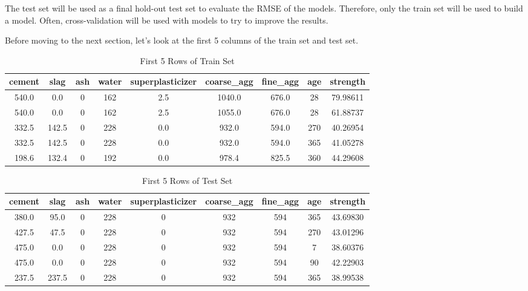 \documentclass[
]{article}
\begin{document}
The test set will be used as a final hold-out test set to evaluate the
RMSE of the models. Therefore, only the train set will be used to build
a model. Often, cross-validation will be used with models to try to
improve the results.~

Before moving to the next section, let's look at the first 5 columns of
the train set and test set.

\begin{table}[H]

\caption{\label{tab:Print 5 rows of train_set}First 5 Rows of Train Set}
\centering
\fontsize{11}{13}\selectfont
\begin{tabular}[t]{|>{}c|||>{}c|||>{}c|||>{}c|||>{}c|||>{}c|||>{}c|||>{}c|||>{}c|}
\hline
cement & slag & ash & water & superplasticizer & coarse\_agg & fine\_agg & age & strength\\
\hline
540.0 & 0.0 & 0 & 162 & 2.5 & 1040.0 & 676.0 & 28 & 79.98611\\
\hline
540.0 & 0.0 & 0 & 162 & 2.5 & 1055.0 & 676.0 & 28 & 61.88737\\
\hline
332.5 & 142.5 & 0 & 228 & 0.0 & 932.0 & 594.0 & 270 & 40.26954\\
\hline
332.5 & 142.5 & 0 & 228 & 0.0 & 932.0 & 594.0 & 365 & 41.05278\\
\hline
198.6 & 132.4 & 0 & 192 & 0.0 & 978.4 & 825.5 & 360 & 44.29608\\
\hline
\end{tabular}
\end{table}

\begin{table}[H]

\caption{\label{tab:Print 5 rows of test_set}First 5 Rows of Test Set}
\centering
\fontsize{11}{13}\selectfont
\begin{tabular}[t]{|>{}c|||>{}c|||>{}c|||>{}c|||>{}c|||>{}c|||>{}c|||>{}c|||>{}c|}
\hline
cement & slag & ash & water & superplasticizer & coarse\_agg & fine\_agg & age & strength\\
\hline
380.0 & 95.0 & 0 & 228 & 0 & 932 & 594 & 365 & 43.69830\\
\hline
427.5 & 47.5 & 0 & 228 & 0 & 932 & 594 & 270 & 43.01296\\
\hline
475.0 & 0.0 & 0 & 228 & 0 & 932 & 594 & 7 & 38.60376\\
\hline
475.0 & 0.0 & 0 & 228 & 0 & 932 & 594 & 90 & 42.22903\\
\hline
237.5 & 237.5 & 0 & 228 & 0 & 932 & 594 & 365 & 38.99538\\
\hline
\end{tabular}
\end{table}
\end{document}
